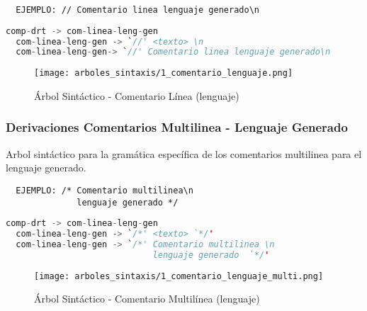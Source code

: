 \begin{lstlisting}
  EJEMPLO: // Comentario linea lenguaje generado\n
\end{lstlisting}

\begin{lstlisting}[basicstyle=\footnotesize\ttfamily, language=Java,
caption={Derivaciones - Comentario Linea (Leng. Generado)}]
  comp-drt -> com-linea-leng-gen
  com-linea-leng-gen -> `//' <texto> \n
  com-linea-leng-gen-> `//' Comentario linea lenguaje generado\n
\end{lstlisting}

\begin{figure}[H]
  \centering
  \texttt{[image: arboles\_sintaxis/1\_comentario\_lenguaje.png]}
  \caption{Árbol Sintáctico - Comentario Línea (lenguaje)}
  \label{as:comlinleng}
\end{figure}

\subsubsection{Derivaciones Comentarios Multilinea - Lenguaje Generado}
Arbol sintáctico para la gramática específica de los comentarios multilinea para
el lenguaje generado.

\begin{lstlisting}
  EJEMPLO: /* Comentario multilinea\n
              lenguaje generado */
\end{lstlisting}

\begin{lstlisting}[basicstyle=\footnotesize\ttfamily, language=Java,
caption={Derivaciones - Comentario Multilinea (Leng. Generado)}]
  comp-drt -> com-linea-leng-gen
  com-linea-leng-gen -> `/*' <texto> `*/'
  com-linea-leng-gen -> `/*' Comentario multilinea \n
                             lenguaje generado  `*/'
\end{lstlisting}

\begin{figure}[H]
  \centering
  \texttt{[image: arboles\_sintaxis/1\_comentario\_lenguaje\_multi.png]}
  \caption{Árbol Sintáctico - Comentario Multilínea (lenguaje)}
  \label{as:commultilinleng}
\end{figure}
